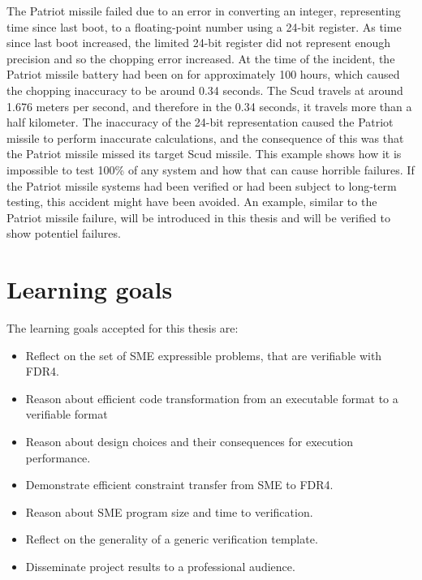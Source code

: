 The Patriot missile failed due to an error in converting an integer, representing time since last boot, to a floating-point number using a 24-bit register. As time since last boot increased, the limited 24-bit register did not represent enough precision and so the chopping error increased. At the time of the incident, the Patriot missile battery had been on for approximately 100 hours, which caused the chopping inaccuracy to be around 0.34 seconds. The Scud travels at around 1.676 meters per second, and therefore in the 0.34 seconds, it travels more than a half kilometer. The inaccuracy of the 24-bit representation caused the Patriot missile to perform inaccurate calculations, and the consequence of this was that the Patriot missile missed its target Scud missile. This example shows how it is impossible to test 100\% of any system and how that can cause horrible failures. If the Patriot missile systems had been verified or had been subject to long-term testing, this accident might have been avoided. An example, similar to the Patriot missile failure, will be introduced in this thesis and will be verified to show potentiel failures.
\section{Learning goals}
The learning goals accepted for this thesis are:
\begin{itemize}
\item Reflect on the set of SME expressible problems, that are verifiable with FDR4.
\item Reason about efficient code transformation from an executable format to a verifiable format
\item Reason about design choices and their consequences for execution performance.
\item Demonstrate efficient constraint transfer from SME to FDR4.
\item Reason about SME program size and time to verification.
\item Reflect on the generality of a generic verification template.
\item Disseminate project results to a professional audience.
\end{itemize}

